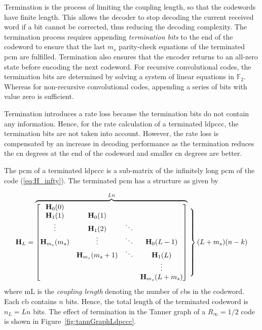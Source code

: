 Termination is the process of limiting the coupling length, so that the codewords have finite length. This allows the decoder to stop decoding the current received word if a bit cannot be corrected, thus reducing the decoding complexity. The termination process requires appending \emph{termination bits} to the end of the codeword to ensure that the last $m_s$ parity-check equations of the terminated \gls{pcm} are fulfilled. Termination also ensures that the encoder returns to an all-zero state before encoding the next codeword. For recursive convolutional codes, the termination bits are determined by solving a system of linear equations in $\mathbb{F}_2$. Whereas for non-recursive convolutional codes, appending a series of bits with value zero is sufficient.

Termination introduces a rate loss because the termination bits do not contain any information. Hence, for the rate calculation of a terminated \gls{ldpccc}, the termination bits are not taken into account. However, the rate loss is compensated by an increase in decoding performance as the termination reduces the \gls{cn} degrees at the end of the codeword and smaller \gls{cn} degrees are better.

The \gls{pcm} of a terminated \gls{ldpccc} is a sub-matrix of the infinitely long \gls{pcm} of the code (\ref{eq:H_infty}). The terminated \gls{pcm} has a structure as given by

\begin{align}
\mathbf{H}_L = 
\overbrace{\begin{bmatrix}
  \mathbf{H}_{0}(0)\\
  \mathbf{H}_1(1) &\mathbf{H}_0(1)\\
  \vdots &\mathbf{H}_1(2) &\ddots\\
  \mathbf{H}_{m_s}(m_s) &\vdots &\ddots &\mathbf{H}_0(L-1)\\
  &\mathbf{H}_{m_s}(m_s+1) &\ddots &\mathbf{H}_{1}(L)\\
  & & &\vdots\\
  & & &\mathbf{H}_{m_s}(L+m_s)
\end{bmatrix}}^{Ln}
\left.\begin{matrix}
\\
\\
\\
\\
\\
\\
\\
\\
\end{matrix}\right\}(L+m_s)(n-k)
\end{align}
where \gls{mL} is the \emph{coupling length} denoting the number of \glspl{cb} in the codeword. Each \gls{cb} contains $n$ bits. Hence, the total length of the terminated codeword is $n_L=Ln$ bits. The effect of termination in the Tanner graph of a $R_\infty=1/2$ code is shown in Figure~\ref{fig:tannGraphLdpccc}.

